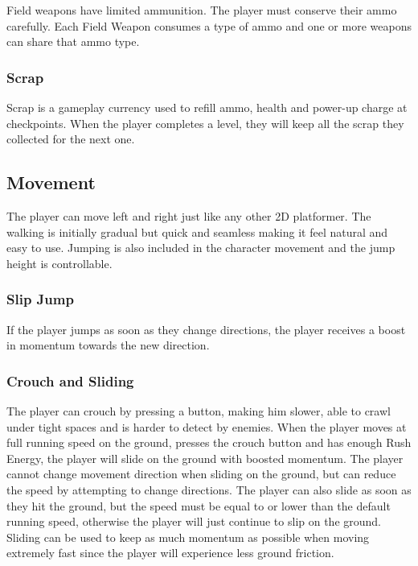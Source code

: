 \documentclass[12pt]{article}
\begin{document}
Field weapons have limited ammunition. The player must conserve their ammo carefully. Each Field Weapon consumes a type of ammo and one or more weapons can share that ammo type. 

\subsubsection{Scrap}

Scrap is a gameplay currency used to refill ammo, health and power-up charge at checkpoints. When the player completes a level, they will keep all the scrap they collected for the next one.  

\subsection{Movement}

The player can move left and right just like any other 2D platformer. The walking is initially gradual but quick and seamless making it feel natural and easy to use. Jumping is also included in the character movement and the jump height is controllable.

\subsubsection{Slip Jump}

If the player jumps as soon as they change directions, the player receives a boost in momentum towards the new direction.

\subsubsection{Crouch and Sliding}

The player can crouch by pressing a button, making him slower, able to crawl under tight spaces and is harder to detect by enemies. When the player moves at full running speed on the ground, presses the crouch button and has enough Rush Energy, the player will slide on the ground with boosted momentum. The player cannot change movement direction when sliding on the ground, but can reduce the speed by attempting to change directions. The player can also slide as soon as they hit the ground, but the speed must be equal to or lower than the default running speed, otherwise the player will just continue to slip on the ground. Sliding can be used to keep as much momentum as possible when moving extremely fast since the player will experience less ground friction. 
\end{document}
